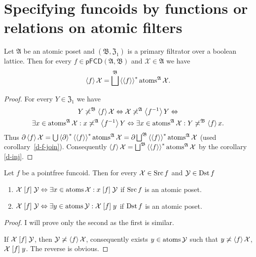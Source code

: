 \section{Specifying funcoids by functions or relations on atomic filters}
\begin{thm}
\label{spfn-atoms}Let $\mathfrak{A}$ be an atomic poset and $(\mathfrak{B},\mathfrak{Z}_{1})$
is a primary filtrator over a boolean lattice. Then for every $f\in\mathsf{pFCD}(\mathfrak{A},\mathfrak{B})$
and $\mathcal{X}\in\mathfrak{A}$ we have
\[
\supfun f\mathcal{X}=\bigsqcup^{\mathfrak{B}}\rsupfun{\supfun f}\atoms^{\mathfrak{A}}\mathcal{X}.
\]
\end{thm}
\begin{proof}
For every $Y\in\mathfrak{Z}_{1}$ we have
\begin{multline*}
Y\not\asymp^{\mathfrak{B}}\left\langle f\right\rangle\mathcal{X}\Leftrightarrow\mathcal{X}\not\asymp^{\mathfrak{A}}\left\langle f^{-1}\right\rangle Y\Leftrightarrow\\
\exists x\in\operatorname{atoms}^{\mathfrak{A}}\mathcal{X}:x\not\asymp^{\mathfrak{A}}\left\langle f^{-1}\right\rangle Y\Leftrightarrow\exists x\in\operatorname{atoms}^{\mathfrak{A}}\mathcal{X}:Y\not\asymp^{\mathfrak{B}}\left\langle f\right\rangle x.
\end{multline*}
Thus $\corestar\supfun f\mathcal{X}=\bigcup\rsupfun{\corestar}\rsupfun{\supfun f}\atoms^{\mathfrak{A}}\mathcal{X}=\corestar\bigsqcup^{\mathfrak{B}}\rsupfun{\supfun f}\atoms^{\mathfrak{A}}\mathcal{X}$
(used corollary~\ref{d-f-join}). Consequently $\supfun f\mathcal{X}=\bigsqcup^{\mathfrak{B}}\rsupfun{\supfun f}\atoms^{\mathfrak{A}}\mathcal{X}$
by the corollary \ref{d-inj}.\end{proof}
\begin{prop}
Let $f$ be a pointfree funcoid. Then for every $\mathcal{X}\in\operatorname{Src} f$
and $\mathcal{Y}\in\operatorname{Dst} f$
\begin{enumerate}
\item $\mathcal{X}\mathrel{\left[f\right]}\mathcal{Y}\Leftrightarrow\exists x\in\operatorname{atoms}\mathcal{X}:x\mathrel{\left[f\right]}\mathcal{Y}$
if $\operatorname{Src} f$ is an atomic poset.
\item $\mathcal{X}\mathrel{\left[f\right]}\mathcal{Y}\Leftrightarrow\exists y\in\operatorname{atoms}\mathcal{Y}:\mathcal{X}\mathrel{\left[f\right]}y$
if $\operatorname{Dst} f$ is an atomic poset.
\end{enumerate}
\end{prop}
\begin{proof}
I will prove only the second as the first is similar.

If $\mathcal{X}\mathrel{\left[f\right]}\mathcal{Y}$, then $\mathcal{Y}\not\asymp\left\langle f\right\rangle\mathcal{X}$,
consequently exists $y\in\operatorname{atoms}\mathcal{Y}$ such that $y\not\asymp\left\langle f\right\rangle\mathcal{X}$,
$\mathcal{X}\mathrel{\left[f\right]}y$. The reverse is obvious.\end{proof}
